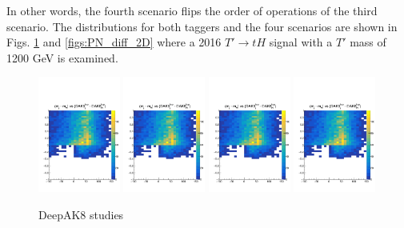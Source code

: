 \documentclass[10pt]{article}
\begin{document}
In other words, the fourth scenario flips the order of operations of the third scenario.
The distributions for both taggers and the four scenarios are shown in Figs.
\ref{figs:DeepAK8_diff_2D} and \ref{figs:PN_diff_2D} where a 2016 $T' \to tH$ signal with
a $T'$ mass of 1200 GeV is examined.

\begin{figure}
    \centering
    \includegraphics[page=1,width=0.24\textwidth]{../plots/diff2Dstudy.pdf}
    \includegraphics[page=2,width=0.24\textwidth]{../plots/diff2Dstudy.pdf}
    \includegraphics[page=3,width=0.24\textwidth]{../plots/diff2Dstudy.pdf}
    \includegraphics[page=4,width=0.24\textwidth]{../plots/diff2Dstudy.pdf}
    \caption{DeepAK8 studies}
    \label{figs:DeepAK8_diff_2D}
\end{figure}
\end{document}
